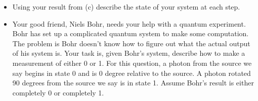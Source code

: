 \documentclass[12pt]{article}
\begin{document}
\begin{enumerate}[font=\bfseries]
\begin{itemize}
        \item Using your result from (c) describe the state of your system at each step.
        \item Your good friend, Niels Bohr, needs your help with a quantum experiment. Bohr has set up a complicated quantum system to make some computation. The problem is Bohr doesn’t know how to figure out what the actual output of his system is. Your task is, given Bohr’s system, describe how to make a measurement of either 0 or 1. For this question, a photon from the source we say begins in state 0 and is 0 degree relative to the source. A photon rotated 90 degrees from the source we say is in state 1. Assume Bohr’s result is either completely 0 or completely 1. 
    \end{itemize}
\end{enumerate}
\end{document}
